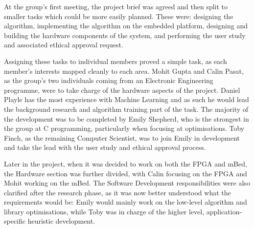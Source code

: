 \label{sec:division}

At the group's first meeting, the project brief was agreed and then split to smaller tasks which could be more easily planned. These were: designing the algorithm, implementing the algorithm on the embedded platform, designing and building the hardware components of the system, and performing the user study and associated ethical approval request.

Assigning these tasks to individual members proved a simple task, as each member's interests mapped cleanly to each area. Mohit Gupta and Calin Pasat, as the group's two individuals coming from an Electronic Engineering programme, were to take charge of the hardware aspects of the project. Daniel Playle has the most experience with Machine Learning and as such he would lead the background research and algorithm training part of the task. The majority of the development was to be completed by Emily Shepherd, who is the strongest in the group at C programming, particularly when focusing at optimisations. Toby Finch, as the remaining Computer Scientist, was to join Emily in development and take the lead with the user study and ethical approval process.

Later in the project, when it was decided to work on both the FPGA and mBed, the Hardware section was further divided, with Calin focusing on the FPGA and Mohit working on the mBed. The Software Development responsibilities were also clarified after the research phase, as it was now better understood what the requirements would be: Emily would mainly work on the low-level algorithm and library optimisations, while Toby was in charge of the higher level, application-specific heuristic development.
